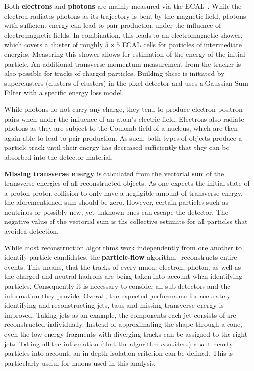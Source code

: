 Both \textbf{electrons} and \textbf{photons} are mainly measured via the ECAL~\cite{elereco}. While the electron radiates photons as its trajectory is bent by the magnetic field, photons with sufficient energy can lead to pair production under the influence of electromagnetic fields. In combination, this leads to an electromagnetic shower, which covers a cluster of roughly $5 \times 5$ ECAL cells for particles of intermediate energies. Measuring this shower allows for estimation of the energy of the initial particle. An additional transverse momentum measurement from the tracker is also possible for tracks of charged particles. Building these is initiated by superclusters (clusters of clusters) in the pixel detector and uses a Gaussian Sum Filter with a specific energy loss model.

While photons do not carry any charge, they tend to produce electron-positron pairs when under the influence of an atom's electric field. Electrons also radiate photons as they are subject to the Coulomb field of a nucleus, which are then again able to lead to pair production. As such, both types of objects produce a particle track until their energy has decreased sufficiently that they can be absorbed into the detector material.

\textbf{Missing transverse energy} is calculated from the vectorial sum of the transverse energies of all reconstructed objects. As one expects the initial state of a proton-proton collision to only have a negligible amount of transverse energy, the aforementioned sum should be zero. However, certain particles such as neutrinos or possibly new, yet unknown ones can escape the detector. The negative value of the vectorial sum is the collective estimate for all particles that avoided detection.

While most reconstruction algorithms work independently from one another to identify particle candidates, the \textbf{particle-flow} algorithm~\cite{pflow} reconstructs entire events. This means, that the tracks of every muon, electron, photon, as well as the charged and neutral hadrons are being taken into account when identifying particles. Consequently it is necessary to consider all sub-detectors and the information they provide. Overall, the expected performance for accurately identifying and reconstructing jets, taus and missing transverse energy is improved. Taking jets as an example, the components each jet consists of are reconstructed individually. Instead of approximating the shape through a cone, even the low energy fragments with diverging tracks can be assigned to the right jets. Taking all the information (that the algorithm considers) about nearby particles into account, an in-depth isolation criterion can be defined. This is particularly useful for muons used in this analysis.



